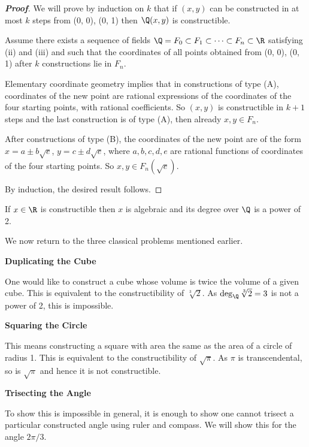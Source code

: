 \begin{proof}[\bf Proof]
We will prove by induction on $k$ that if $(x, y)$ can be constructed in at most $k$ steps from (0, 0), (0, 1) then $\Q(x, y)$ is constructible.

Assume there exists a sequence of fields $\Q = F_0 \subset F_1 \subset \dots\subset F_n \subset \R$ satisfying (ii) and (iii) and such that the coordinates of all points obtained from (0, 0), (0, 1) after $k$ constructions lie in $F_n$.

Elementary coordinate geometry implies that in constructions of type (A), coordinates of the new point are rational expressions of the coordinates of the four starting points, with rational coefficients. So $(x, y)$ is constructible in $k +1$ steps and the last construction is of type (A), then already $x, y \in F_n$.

After constructions of type (B), the coordinates of the new point are of the form $x = a \pm b\sqrt{e}$, $y = c \pm d\sqrt{e}$, where $a, b, c, d, e$ are rational functions of coordinates of the four starting points. So $x, y \in F_n(\sqrt{e})$.

By induction, the desired result follows.
\end{proof}

\begin{corollary}
If $x \in \R$ is constructible then $x$ is algebraic and its degree over $\Q$ is a power of 2.
\end{corollary}

We now return to the three classical problems mentioned earlier.

{\bf Duplicating the Cube}

One would like to construct a cube whose volume is twice the volume of a given cube. This is equivalent to the constructibility of $\sqrt[3]{2}$. As $\deg_\Q \sqrt[3]{2} = 3$ is not a power of 2, this is impossible.

{\bf Squaring the Circle}

This means constructing a square with area the same as the area of a circle of radius 1. This is equivalent to the constructibility of $\sqrt{\pi}$. As $\pi$ is transcendental, so is $\sqrt{\pi}$ and hence it is not constructible.

{\bf Trisecting the Angle}

To show this is impossible in general, it is enough to show one cannot trisect a particular constructed angle using ruler and compass. We will show this for the angle $2\pi /3$.

